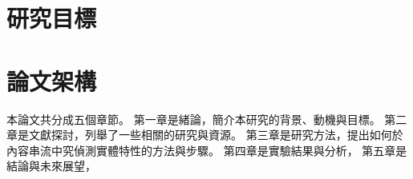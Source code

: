 \section{研究目標}

\section{論文架構}  %
本論文共分成五個章節。
第一章是緒論，簡介本研究的背景、動機與目標。
第二章是文獻探討，列舉了一些相關的研究與資源。
第三章是研究方法，提出如何於內容串流中究偵測實體特性的方法與步驟。
第四章是實驗結果與分析，
第五章是結論與未來展望，


%
%

